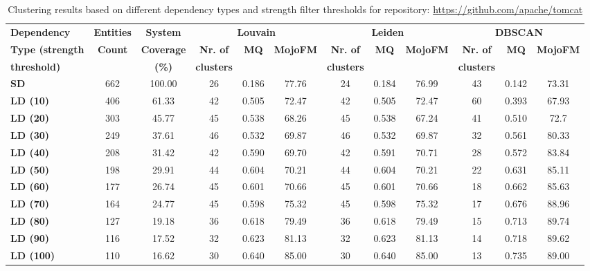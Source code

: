 \documentclass{ieeeaccess}
\begin{document}
\begin{table}[htbp]
\centering
\caption{Clustering results based on different dependency types and strength filter thresholds for repository: \href{https://github.com/apache/tomcat}{https://github.com/apache/tomcat}}
\label{tab:clustering_results_tomcat}
\setlength{\tabcolsep}{7pt} 
\begin{tabular}{|l|c|c|ccc|ccc|ccc|}
\hline
 \textbf{Dependency} &  \textbf{Entities} & \textbf{System} & \multicolumn{3}{c|}{\textbf{Louvain}} & \multicolumn{3}{c|}{\textbf{Leiden}} & \multicolumn{3}{c|}{\textbf{DBSCAN}} \\
\cline{4-12}
\textbf{Type (strength } &  \textbf{Count} & \textbf{Coverage} & \textbf{Nr. of } & \textbf{MQ} & \textbf{MojoFM} & \textbf{Nr. of} & \textbf{MQ} & \textbf{MojoFM} & \textbf{Nr. of} & \textbf{MQ} & \textbf{MojoFM}  \\
\textbf{threshold)} &  & \textbf{(\%)} & \textbf{clusters} & & & \textbf{clusters} & &  & \textbf{clusters} & &\\
\hline
\rowcolor[HTML]{ECECEC} \textbf{SD} & 662 & 100.00 & 26 & 0.186 & 77.76 & 24 & 0.184 & 76.99 & 43 & 0.142 & 73.31  \\
\textbf{LD (10)} & 406 & 61.33 & 42 & 0.505 & 72.47 & 42 & 0.505 & 72.47 & 60 & 0.393 & 67.93 \\
\textbf{LD (20)} & 303 & 45.77 & 45 & 0.538 & 68.26 & 45 & 0.538 & 67.24 & 41 & 0.510 & 72.7 \\
\textbf{LD (30)} & 249 & 37.61 & 46 & 0.532 & 69.87 & 46 & 0.532 & 69.87 & 32 & 0.561 & 80.33 \\
\textbf{LD (40)} & 208 & 31.42 & 42 & 0.590 & 69.70 & 42 & 0.591 & 70.71 & 28 & 0.572 & 83.84 \\
\textbf{LD (50)} & 198 & 29.91 & 44 & 0.604 & 70.21 & 44 & 0.604 & 70.21 & 22 & 0.631 & 85.11 \\
\textbf{LD (60)} & 177 & 26.74 & 45 & 0.601 & 70.66 & 45 & 0.601 & 70.66 & 18 & 0.662 & 85.63 \\
\textbf{LD (70)} & 164 & 24.77 & 45 & 0.598 & 75.32 & 45 & 0.598 & 75.32 & 17 & 0.676 & 88.96 \\
\textbf{LD (80)} & 127 & 19.18 & 36 & 0.618 & 79.49 & 36 & 0.618 & 79.49 & 15 & 0.713 & \cellcolor[HTML]{fef9e4}89.74 \\
\textbf{LD (90)} & 116 & 17.52 & 32 & 0.623 & 81.13 & 32 & 0.623 & 81.13 & 14 & 0.718 & 89.62 \\
\textbf{LD (100)} & 110 & 16.62 & 30 & \cellcolor[HTML]{fef9e4}0.640 & \cellcolor[HTML]{fef9e4}85.00 & 30 & \cellcolor[HTML]{fef9e4}0.640 & \cellcolor[HTML]{fef9e4}85.00 & 13 & \cellcolor[HTML]{fef9e4}0.735 & 89.00 \\

\end{tabular}
\end{table}
\end{document}

